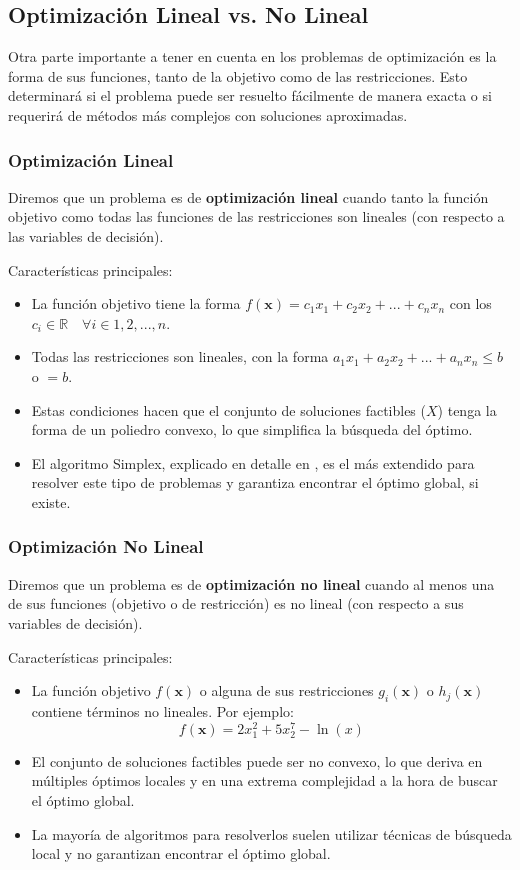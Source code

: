 \documentclass[12pt,a4paper]{book}
\begin{document}
\hrulefill

\subsection{Optimización Lineal vs. No Lineal}

Otra parte importante a tener en cuenta en los problemas de optimización es la forma de sus funciones, tanto de la objetivo como de las restricciones. Esto determinará si el problema puede ser resuelto fácilmente de manera exacta o si requerirá de métodos más complejos con soluciones aproximadas.

\subsubsection{Optimización Lineal}
Diremos que un problema es de \textbf{optimización lineal} cuando tanto la función objetivo como todas las funciones de las restricciones son lineales (con respecto a las variables de decisión). 

Características principales:
\begin{itemize}
    \item La función objetivo tiene la forma $f(\mathbf{x})=c_1x_1+c_2x_2+...+c_nx_n$ con los $c_i \in \mathbb{R} \quad \forall i \in 1,2,...,n$.
    \item Todas las restricciones son lineales, con la forma $a_1x_1+a_2x_2+...+a_nx_n\leq b$ o $=b$.
    \item Estas condiciones hacen que el conjunto de soluciones factibles ($X$) tenga la forma de un poliedro convexo, lo que simplifica la búsqueda del óptimo.
    \item El algoritmo Simplex, explicado en detalle en \cite{Dantzig1951}, es el más extendido para resolver este tipo de problemas y garantiza encontrar el óptimo global, si existe.
\end{itemize}

\subsubsection{Optimización No Lineal}
Diremos que un problema es de \textbf{optimización no lineal} cuando al menos una de sus funciones (objetivo o de restricción) es no lineal (con respecto a sus variables de decisión). 

Características principales:
\begin{itemize}
    \item La función objetivo $f(\mathbf{x})$ o alguna de sus restricciones $g_i(\mathbf{x})$ o $h_j(\mathbf{x})$ contiene términos no lineales. Por ejemplo:
    $$f(\mathbf{x})=2x_1^2+5x_2^7-\ln(x)$$
    \item El conjunto de soluciones factibles puede ser no convexo, lo que deriva en múltiples óptimos locales y en una extrema complejidad a la hora de buscar el óptimo global.
    \item La mayoría de algoritmos para resolverlos suelen utilizar técnicas de búsqueda local y no garantizan encontrar el óptimo global.
\end{itemize}
\end{document}
